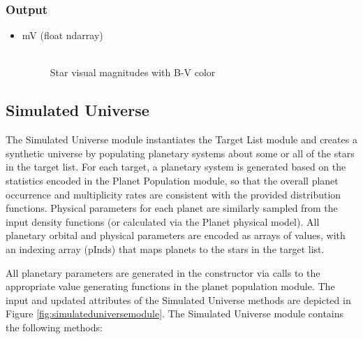 \documentclass[cleanfoot]{asme2ej}
\newcommand{\reffig}[1]{Figure \ref{#1}}
\begin{document}
\subsubsection*{Output}
\begin{itemize}
\item
\begin{description}
    \item[mV (float ndarray)] \hfill \\ Star visual magnitudes with B-V color
\end{description}
\end{itemize}




\subsection{Simulated Universe} \label{sec:simulateduniverse}
The Simulated Universe module instantiates the Target List module and creates a synthetic universe by populating planetary systems about some or all of the stars in the target list.  For each target, a planetary system is generated based on the statistics encoded in the Planet Population module, so that the overall planet occurrence and multiplicity rates are consistent with the provided distribution functions.  Physical parameters for each planet are similarly sampled from the input density functions (or calculated via the Planet physical model).  All planetary orbital and physical parameters are encoded as arrays of values, with an indexing array (pInds) that maps planets to the stars in the target list. 

All planetary parameters are generated in the constructor via calls to the appropriate value generating functions in the planet population module. The input and updated attributes of the Simulated Universe methods are depicted in \reffig{fig:simulateduniversemodule}. The Simulated Universe module contains the following methods: 
\end{document}
